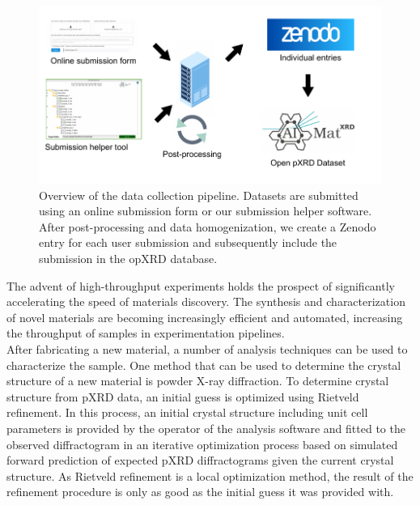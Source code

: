 \begin{figure}[!htb]
    \centering
    \includegraphics{figures/overview.pdf}
    \caption{Overview of the data collection pipeline. Datasets are submitted using an online submission form or our submission helper software. After post-processing and data homogenization, we create a Zenodo entry for each user submission and subsequently include the submission in the opXRD database.}
    \label{fig:overview}
\end{figure}


The advent of high-throughput experiments holds the prospect of significantly accelerating the speed of materials discovery. \cite{Liu2019} The synthesis and characterization of novel materials are becoming increasingly efficient and automated, increasing the throughput of samples in experimentation pipelines. \cite{MacLeod2019, Ludwig2019, Ozaki2020} \\

After fabricating a new material, a number of analysis techniques can be used to characterize the sample. One method that can be used to determine the crystal structure of a new material is powder X-ray diffraction. To determine crystal structure from pXRD data, an initial guess is optimized using Rietveld refinement. In this process, an initial crystal structure including unit cell parameters is provided by the operator of the analysis software and fitted to the observed diffractogram in an iterative optimization process based on simulated forward prediction of expected pXRD diffractograms given the current crystal structure. \cite{Dinnebier2019, Cano2021} As Rietveld refinement is a local optimization method, the result of the refinement procedure is only as good as the initial guess it was provided with. \\

